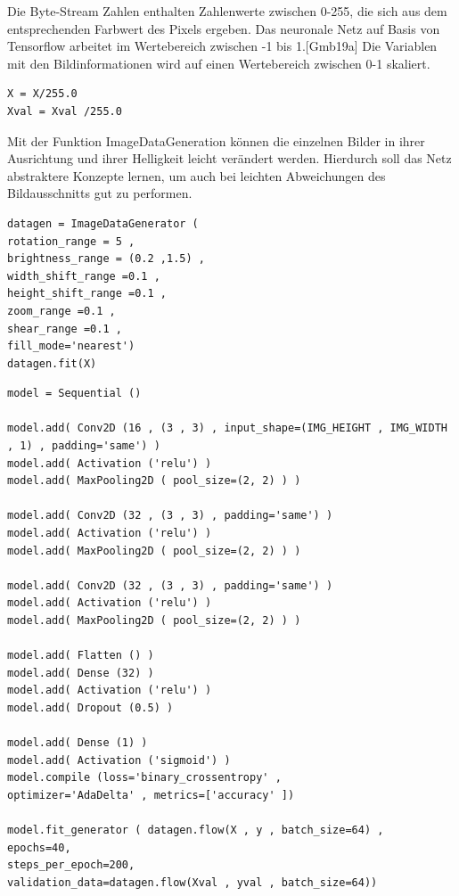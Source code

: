 Die Byte-Stream Zahlen enthalten Zahlenwerte zwischen 0-255, die sich aus dem entsprechenden 
Farbwert des Pixels ergeben. Das neuronale Netz auf Basis von Tensorflow
arbeitet im Wertebereich zwischen -1 bis 1.[Gmb19a] Die Variablen mit den Bildinformationen 
wird auf einen Wertebereich zwischen 0-1 skaliert.


\begin{lstlisting}
X = X/255.0
Xval = Xval /255.0
\end{lstlisting}

Mit der Funktion ImageDataGeneration können die einzelnen Bilder in ihrer Ausrichtung
und ihrer Helligkeit leicht verändert werden. Hierdurch soll das Netz abstraktere Konzepte
lernen, um auch bei leichten Abweichungen des Bildausschnitts gut zu performen.

\begin{lstlisting}
datagen = ImageDataGenerator (
rotation_range = 5 ,
brightness_range = (0.2 ,1.5) ,
width_shift_range =0.1 ,
height_shift_range =0.1 ,
zoom_range =0.1 ,
shear_range =0.1 ,
fill_mode='nearest')
datagen.fit(X)
\end{lstlisting}

\begin{lstlisting}
model = Sequential ()

model.add( Conv2D (16 , (3 , 3) , input_shape=(IMG_HEIGHT , IMG_WIDTH , 1) , padding='same') )
model.add( Activation ('relu') )
model.add( MaxPooling2D ( pool_size=(2, 2) ) )

model.add( Conv2D (32 , (3 , 3) , padding='same') )
model.add( Activation ('relu') )
model.add( MaxPooling2D ( pool_size=(2, 2) ) )

model.add( Conv2D (32 , (3 , 3) , padding='same') )
model.add( Activation ('relu') )
model.add( MaxPooling2D ( pool_size=(2, 2) ) )

model.add( Flatten () )
model.add( Dense (32) )
model.add( Activation ('relu') )
model.add( Dropout (0.5) )

model.add( Dense (1) )
model.add( Activation ('sigmoid') )
model.compile (loss='binary_crossentropy' ,
optimizer='AdaDelta' , metrics=['accuracy' ])

model.fit_generator ( datagen.flow(X , y , batch_size=64) ,
epochs=40,
steps_per_epoch=200,
validation_data=datagen.flow(Xval , yval , batch_size=64))
\end{lstlisting}


